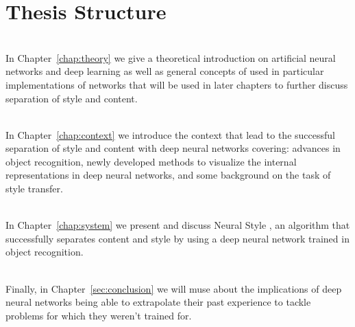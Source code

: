 
\section{Thesis Structure}
\label{sec:intro:structure}

\textbf{} \\[0.2em]
In Chapter~\ref{chap:theory} we give a theoretical introduction on artificial neural networks and deep learning as well as general concepts of used in particular implementations of networks that will be used in later chapters to further discuss separation of style and content.

\textbf{} \\[0.2em]
In Chapter~\ref{chap:context} we introduce the context that lead to the successful separation of style and content with deep neural networks covering: advances in object recognition, newly developed methods to visualize the internal representations in deep neural networks, and some background on the task of style transfer.

\textbf{} \\[0.2em]
In Chapter~\ref{chap:system} we present and discuss Neural Style \cite{Gatys2015B}, an algorithm that successfully separates content and style by using a deep neural network trained in object recognition.

\textbf{} \\[0.2em]
Finally, in Chapter~\ref{sec:conclusion} we will muse about the implications of deep neural networks being able to extrapolate their past experience to tackle problems for which they weren't trained for.
